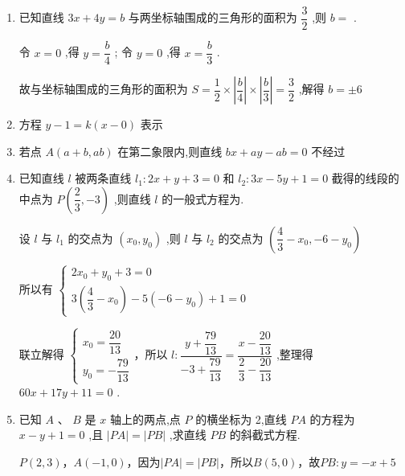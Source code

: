 \begin{enumerate}
    \item 已知直线 ${3x} + {4y} = b$ 与两坐标轴围成的三角形的面积为 $\dfrac{3}{2}$ ,则 $b =$ .
    \begin{jieda}
        令 $x = 0$ ,得 $y = \dfrac{b}{4}$ ; 令 $y = 0$ ,得 $x = \dfrac{b}{3}$ .
        
        故与坐标轴围成的三角形的面积为 $S = \dfrac{1}{2} \times  \left| \dfrac{b}{4}\right|  \times  \left| \dfrac{b}{3}\right|  = \dfrac{3}{2}$ ,解得 $b =  \pm  6$
    \end{jieda}
    
    \item 方程 $y - 1 = k\left( {x - 0}\right)$ 表示
    
    \item 若点 $A\left( {a + b,{ab}}\right)$ 在第二象限内,则直线 ${bx} + {ay} - {ab} = 0$ 不经过
    
    \item 已知直线 $l$ 被两条直线 ${l}_{1} : {2x} + y + 3 = 0$ 和 ${l}_{2} : {3x} - {5y} + 1 = 0$ 截得的线段的中点为 $P\left( {\dfrac{2}{3}, - 3}\right)$ ,则直线 $l$ 的一般式方程为.
    \begin{jieda}
        设 $l$ 与 ${l}_{1}$ 的交点为 $\left( {{x}_{0},{y}_{0}}\right)$ ,则 $l$ 与 ${l}_{2}$ 的交点为 $\left( {\dfrac{4}{3} - {x}_{0}, - 6 - {y}_{0}}\right)$
        
        所以有 $\left\{ \begin{array}{l}
             2{x}_{0} + {y}_{0} + 3 = 0  \\
             3\left( {\dfrac{4}{3} - {x}_{0}}\right)  - 5\left( {-6 - {y}_{0}}\right)  + 1 = 0
        \end{array}\right.$
        
        联立解得 $\left\{  \begin{array}{l} {x}_{0} = \dfrac{20}{13} \\  {y}_{0} =  - \dfrac{79}{13} \end{array}\right.$，所以 $l : \dfrac{y + \dfrac{79}{13}}{-3 + \dfrac{79}{13}} = \dfrac{x - \dfrac{20}{13}}{\dfrac{2}{3} - \dfrac{20}{13}}$ ,整理得 ${60x} + {17y} + {11} = 0$ .
    \end{jieda}
    
    \item 已知 $A\text{ 、 }B$ 是 $x$ 轴上的两点,点 $P$ 的横坐标为 2,直线 ${PA}$ 的方程为 $x - y + 1 = 0$ ,且 $\left| {PA}\right|  = \left| {PB}\right|$ ,求直线 ${PB}$ 的斜截式方程.
    \begin{jieda}
        $P(2, 3)$，$A(-1, 0)$，因为$\left| {PA}\right|  = \left| {PB}\right|$，所以$B(5, 0)$，故$PB: y = -x+5$
    \end{jieda}
    

\end{enumerate}

